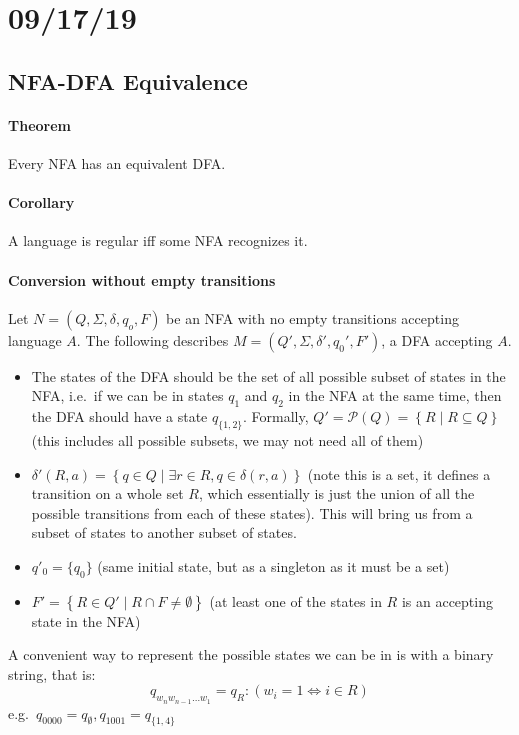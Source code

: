 \documentclass[12 pt]{article}
\begin{document}
\section{09/17/19}
\subsection{NFA-DFA Equivalence}
\paragraph{Theorem} Every NFA has an equivalent DFA.
\paragraph{Corollary} A language is regular iff some NFA recognizes
it.
\paragraph{Conversion without empty transitions}
Let $N = (Q, \Sigma, \delta, q_o, F)$ be an NFA with no empty
transitions accepting language $A$. The following describes $M = (Q',
\Sigma, \delta', q_0', F')$, a DFA accepting $A$.
\begin{itemize}
\item The states of the DFA should be the set of all possible subset
  of states in the NFA, i.e.\ if we can be in states $q_1$ and $q_2$
  in the NFA at the same time, then the DFA should have a state
  $q_{\{1,2\}}$. Formally, $Q' = \mathcal{P}(Q) = \left\{R \mid R
    \subseteq Q\right\}$ (this includes all possible subsets, we may
  not need all of them)
\item $\delta'(R, a) = \left\{q \in Q \mid \exists r \in R, q \in
    \delta(r,a)\right\}$ (note this is a set, it defines a transition
  on a whole set $R$, which essentially is just the union of all the
  possible transitions from each of these states). This will bring us
  from a subset of states to another subset of states.
\item $q'_0 = \{q_0\}$ (same initial state, but as a singleton as it
  must be a set)
\item $F' = \left\{R \in Q' \mid R \cap F \neq \emptyset\right\}$ (at
  least one of the states in $R$ is an accepting state in the NFA)
\end{itemize}
A convenient way to represent the possible states we can be in is with
a binary string, that is:
$$q_{w_nw_{n-1}\ldots w_1} = q_{R} : (w_i = 1 \iff i \in R)$$
e.g.\ $q_{0000} = q_{\emptyset}, q_{1001} = q_{\{1,4\}}$
\end{document}
